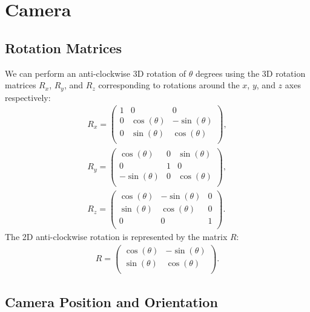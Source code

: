 \section{Camera}

\subsection{Rotation Matrices}

We can perform an anti-clockwise 3D rotation of $\theta$ degrees 
using the 3D rotation matrices $R_x$, $R_y$, and $R_z$ corresponding 
to rotations around the $x$, $y$, and $z$ axes respectively: \begin{align*}
    R_x = \begin{pmatrix}
        1 & 0 & 0 \\
        0 & \cos(\theta) & -\sin(\theta) \\
        0 & \sin(\theta) & \cos(\theta) \\
    \end{pmatrix}, \\
    R_y = \begin{pmatrix}
        \cos(\theta) & 0 & \sin(\theta) \\
        0 & 1 & 0 \\
        -\sin(\theta) & 0 & \cos(\theta) \\
    \end{pmatrix}, \\
    R_z = \begin{pmatrix}
        \cos(\theta) & -\sin(\theta) & 0 \\
        \sin(\theta) & \cos(\theta) & 0 \\
        0 & 0 & 1 \\
    \end{pmatrix}.
\end{align*} The 2D anti-clockwise rotation is represented by the matrix $R$: \begin{align*}
    R = \begin{pmatrix}
        \cos(\theta) & -\sin(\theta) \\
        \sin(\theta) & \cos(\theta) \\
    \end{pmatrix}.
\end{align*}


\subsection{Camera Position and Orientation}

